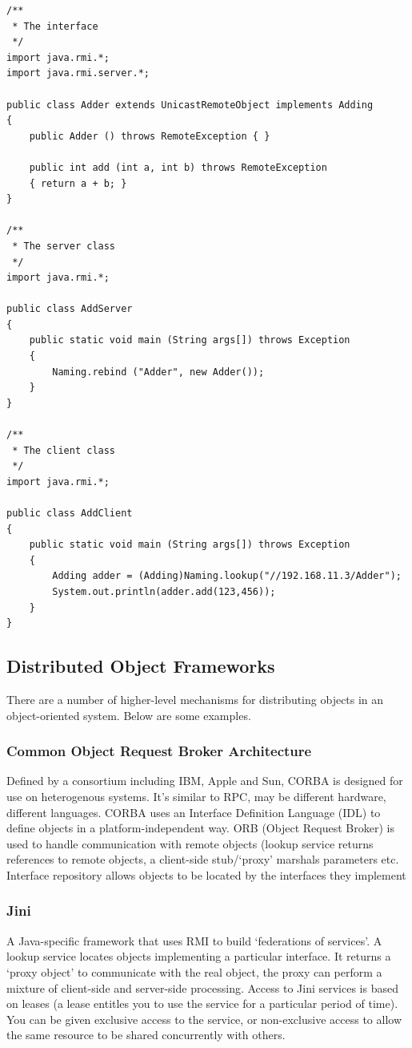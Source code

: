 \documentclass[a4paper,oneside]{report}
\begin{document}
\begin{lstlisting}[label=some-code,caption=Implementing RMI] 
/**
 * The interface
 */
import java.rmi.*;
import java.rmi.server.*;
   
public class Adder extends UnicastRemoteObject implements Adding 
{
    public Adder () throws RemoteException { }
    		
  	public int add (int a, int b) throws RemoteException
	{ return a + b; }
}
  			
/**
 * The server class
 */
import java.rmi.*; 
  		
public class AddServer 
{
	public static void main (String args[]) throws Exception 
	{
		Naming.rebind ("Adder", new Adder()); 
	}
}

/**
 * The client class
 */	
import java.rmi.*;

public class AddClient 
{
    public static void main (String args[]) throws Exception 
	{
      	Adding adder = (Adding)Naming.lookup("//192.168.11.3/Adder");
		System.out.println(adder.add(123,456));
	}
}
\end{lstlisting}
  	
    	\subsection{Distributed Object Frameworks}
    	There are a number of higher-level mechanisms for distributing objects in an object-oriented system. Below are some examples.
    	
      		\subsubsection{Common Object Request Broker Architecture}
      		 Defined by a consortium including IBM, Apple and Sun, CORBA is designed for use on heterogenous systems. It's similar to RPC, may be different hardware, different languages. CORBA uses an Interface Definition Language (IDL) to define objects in a platform-independent way. ORB (Object Request Broker) is used to handle communication with remote objects (lookup service returns references to remote objects, a client-side stub/`proxy' marshals parameters etc. Interface repository allows objects to be located by the interfaces they implement
      		
      		\subsubsection{Jini}
      		A Java-specific framework that uses RMI to build ‘federations of services’. A lookup service locates objects implementing a particular interface. It returns a ‘proxy object’ to communicate with the real object, the proxy can perform a mixture of client-side and server-side processing. Access to Jini services is based on leases (a lease entitles you to use the service for a particular period of time). You can be given exclusive access to the service, or non-exclusive access to allow the same resource to be shared concurrently with others.
      	 
\end{document}
